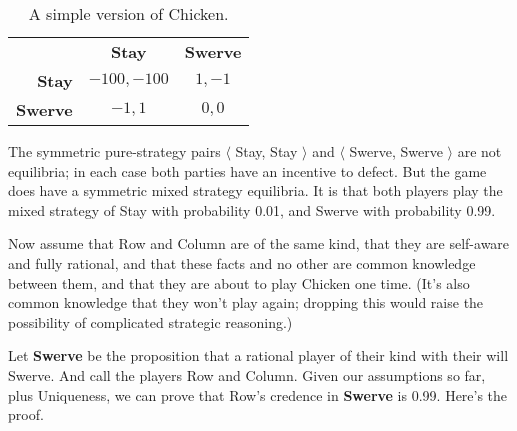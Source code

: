 \documentclass[
  11pt,
]{article}
\begin{document}
\renewcommand{\arraystretch}{1.2}   
\begin{table}

\caption{\label{tab:chicken}A simple version of Chicken.}
\centering \vspace{4pt}
\begin{tabular}[t]{>{}r>{}c>{}c}

\textbf{} & \textbf{Stay} & \textbf{Swerve}\\

\textbf{Stay} & $-100, -100$ & $1, -1$\\
\textbf{Swerve} & $-1, 1$ & $0, 0$\\

\end{tabular}
\end{table}

The symmetric pure-strategy pairs \(\langle\) Stay, Stay \(\rangle\) and \(\langle\) Swerve, Swerve \(\rangle\) are not equilibria; in each case both parties have an incentive to defect. But the game does have a symmetric mixed strategy equilibria. It is that both players play the mixed strategy of Stay with probability 0.01, and Swerve with probability 0.99.

Now assume that Row and Column are of the same kind, that they are self-aware and fully rational, and that these facts and no other are common knowledge between them, and that they are about to play Chicken one time. (It's also common knowledge that they won't play again; dropping this would raise the possibility of complicated strategic reasoning.)

Let \textbf{Swerve} be the proposition that a rational player of their kind with their will Swerve. And call the players Row and Column. Given our assumptions so far, plus Uniqueness, we can prove that Row's credence in \textbf{Swerve} is 0.99. Here's the proof.
\end{document}

